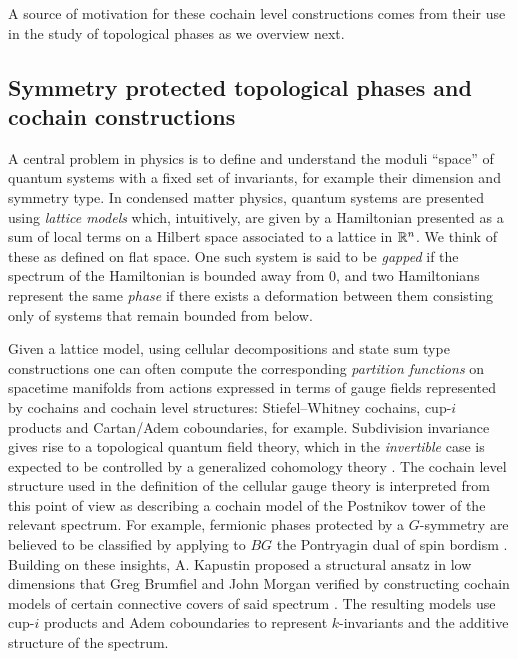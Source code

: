 A source of motivation for these cochain level constructions comes from their use in the study of topological phases as we overview next.

\subsection{Symmetry protected topological phases and cochain constructions}

A central problem in physics is to define and understand the moduli ``space'' of quantum systems with a fixed set of invariants, for example their dimension and symmetry type.
In condensed matter physics, quantum systems are
presented using \textit{lattice models} which, intuitively, are given by a Hamiltonian presented as a sum of local terms on a Hilbert space associated to a lattice in $\mathbb{R}^n$.
We think of these as defined on flat space.
One such system is said to be \textit{gapped} if the spectrum of the Hamiltonian is bounded away from $0$, and two Hamiltonians represent the same \textit{phase} if there exists a deformation between them consisting only of systems that remain bounded from below.

Given a lattice model, using cellular decompositions and state sum type constructions one can often compute the corresponding \textit{partition functions} on spacetime manifolds from actions expressed in terms of gauge fields represented by cochains and cochain level structures: Stiefel--Whitney cochains, cup-$i$ products and Cartan/Adem coboundaries, for example.
Subdivision invariance gives rise to a topological quantum field theory, which in the \textit{invertible} case is expected to be controlled by a generalized cohomology theory \cite{xiong2018minimalist, gaiotto2019cohomology, freed2021reflection}.
The cochain level structure used in the definition of the cellular gauge theory is interpreted from this point of view as describing a cochain model of the Postnikov tower of the relevant spectrum.
For example, fermionic phases protected by a $G$-symmetry are believed to be classified by applying to $BG$ the Pontryagin dual of spin bordism \cite{kapustin2015cobordism, kapustin2017fermionic}.
Building on these insights, A. Kapustin proposed a structural ansatz in low dimensions that Greg Brumfiel and John Morgan verified by constructing cochain models of certain connective covers of said spectrum \cite{brumfiel2016pontrjagin, brumfiel2018pontrjagin}.
The resulting models use cup-$i$ products and Adem coboundaries to represent $k$-invariants and the additive structure of the spectrum.
